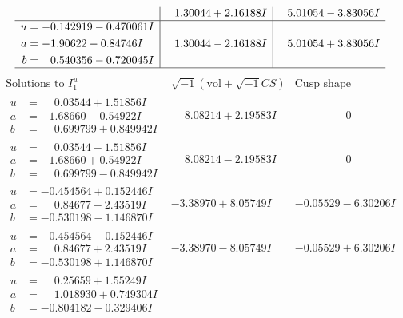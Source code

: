 \documentclass[1p]{elsarticle_modified}
\theoremstyle{definition}
\newcommand{\I}{\sqrt{-1}}
\begin{document}
$$\begin{array}{c|c|c}
 & \phantom{-}1.30044 + 2.16188 I & \phantom{-}5.01054 - 3.83056 I \\ \hline\begin{aligned}
u &= -0.142919 - 0.470061 I \\
a &= -1.90622 - 0.84746 I \\
b &= \phantom{-}0.540356 - 0.720045 I\end{aligned}
 & \phantom{-}1.30044 - 2.16188 I & \phantom{-}5.01054 + 3.83056 I\\
 \hline 
 \end{array}$$\newpage$$\begin{array}{c|c|c}  
\text{Solutions to }I^u_{1}& \I (\text{vol} + \sqrt{-1}CS) & \text{Cusp shape}\\
 \hline 
\begin{aligned}
u &= \phantom{-}0.03544 + 1.51856 I \\
a &= -1.68660 - 0.54922 I \\
b &= \phantom{-}0.699799 + 0.849942 I\end{aligned}
 & \phantom{-}8.08214 + 2.19583 I & \phantom{-0.000000 } 0 \\ \hline\begin{aligned}
u &= \phantom{-}0.03544 - 1.51856 I \\
a &= -1.68660 + 0.54922 I \\
b &= \phantom{-}0.699799 - 0.849942 I\end{aligned}
 & \phantom{-}8.08214 - 2.19583 I & \phantom{-0.000000 } 0 \\ \hline\begin{aligned}
u &= -0.454564 + 0.152446 I \\
a &= \phantom{-}0.84677 - 2.43519 I \\
b &= -0.530198 - 1.146870 I\end{aligned}
 & -3.38970 + 8.05749 I & -0.05529 - 6.30206 I \\ \hline\begin{aligned}
u &= -0.454564 - 0.152446 I \\
a &= \phantom{-}0.84677 + 2.43519 I \\
b &= -0.530198 + 1.146870 I\end{aligned}
 & -3.38970 - 8.05749 I & -0.05529 + 6.30206 I \\ \hline\begin{aligned}
u &= \phantom{-}0.25659 + 1.55249 I \\
a &= \phantom{-}1.018930 + 0.749304 I \\
b &= -0.804182 - 0.329406 I\end{aligned}

\end{array}$$
\end{document}
